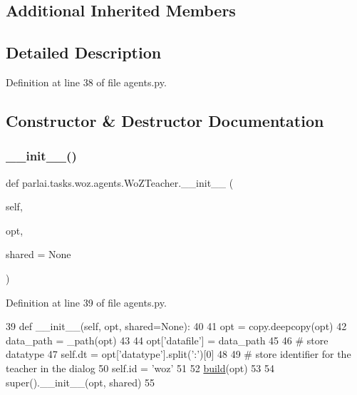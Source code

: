 \subsection*{Additional Inherited Members}


\subsection{Detailed Description}


Definition at line 38 of file agents.\+py.



\subsection{Constructor \& Destructor Documentation}
\mbox{\label{classparlai_1_1tasks_1_1woz_1_1agents_1_1WoZTeacher_a7551f5329374f3a7adcaf1c7026db79f}} 
\subsubsection{\texorpdfstring{\+\_\+\+\_\+init\+\_\+\+\_\+()}{\_\_init\_\_()}}
{\footnotesize\ttfamily def parlai.\+tasks.\+woz.\+agents.\+Wo\+Z\+Teacher.\+\_\+\+\_\+init\+\_\+\+\_\+ (\begin{DoxyParamCaption}\item[{}]{self,  }\item[{}]{opt,  }\item[{}]{shared = {\ttfamily None} }\end{DoxyParamCaption})}



Definition at line 39 of file agents.\+py.


\begin{DoxyCode}
39     \textcolor{keyword}{def }\_\_init\_\_(self, opt, shared=None):
40 
41         opt = copy.deepcopy(opt)
42         data\_path = \_path(opt)
43 
44         opt[\textcolor{stringliteral}{'datafile'}] = data\_path
45 
46         \textcolor{comment}{# store datatype}
47         self.dt = opt[\textcolor{stringliteral}{'datatype'}].split(\textcolor{stringliteral}{':'})[0]
48 
49         \textcolor{comment}{# store identifier for the teacher in the dialog}
50         self.id = \textcolor{stringliteral}{'woz'}
51 
52         \hyperlink{namespaceparlai_1_1mturk_1_1tasks_1_1talkthewalk_1_1download_a8c0fbb9b6dfe127cb8c1bd6e7c4e33fd}{build}(opt)
53 
54         super().\_\_init\_\_(opt, shared)
55 
\end{DoxyCode}


